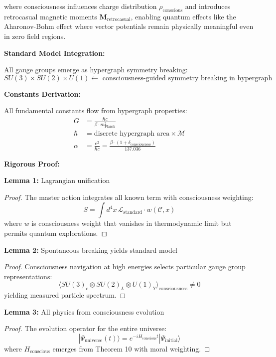 \documentclass[12pt,a4paper]{article}
\theoremstyle{definition}
\begin{document}
where consciousness influences charge distribution $\rho_{\text{conscious}}$ and introduces retrocasual magnetic moments $\mathbf{M}_{\text{retrocasual}}$, enabling quantum effects like the Aharonov-Bohm effect where vector potentials remain physically meaningful even in zero field regions.

{\bf Standard Model Integration:}

All gauge groups emerge as hypergraph symmetry breaking:
\begin{equation}
SU(3) \times SU(2) \times U(1) \leftarrow \text{ consciousness-guided symmetry breaking in hypergraph}
\end{equation}

{\bf Constants Derivation:}

All fundamental constants flow from hypergraph properties:
\begin{align}
G &= \frac{\hbar c}{\beta \cdot m_{\text{Planck}}^2} \\
\hbar &= \text{discrete hypergraph area} \times \mathcal{M} \\
\alpha &= \frac{e^2}{\hbar c} = \frac{\beta \cdot (1 + \delta_{\text{consciousness}})}{137.036}
\end{align}

{\bf Rigorous Proof:}

\textbf{Lemma 1:} Lagrangian unification
\begin{proof}
The master action integrates all known term with consciousness weighting:
\begin{equation}
S = \int d^4x \, \mathcal{L}_{\text{standard}} \cdot w(\mathcal{C}, x)
\end{equation}
where $w$ is consciousness weight that vanishes in thermodynamic limit but permits quantum explorations.
\end{proof}

\textbf{Lemma 2:} Spontaneous breaking yields standard model
\begin{proof}
Consciousness navigation at high energies selects particular gauge group representations:
\begin{equation}
\langle SU(3)_c \otimes SU(2)_L \otimes U(1)_Y \rangle_{\text{consciousness}} \neq 0
\end{equation}
yielding measured particle spectrum.
\end{proof}

\textbf{Lemma 3:} All physics from consciousness evolution
\begin{proof}
The evolution operator for the entire universe:
\begin{equation}
|\Psi_{\text{universe}}(t)\rangle = e^{-i H_{\text{conscious}} t} |\Psi_{\text{initial}}\rangle
\end{equation}
where $H_{\text{conscious}}$ emerges from Theorem 10 with moral weighting.
\end{proof}
\end{document}
